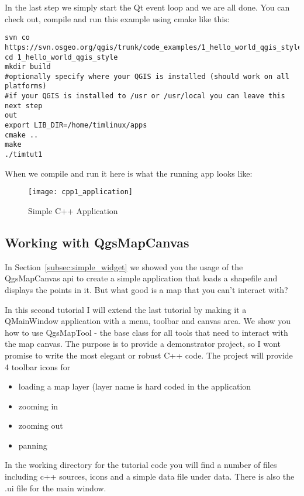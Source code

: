 In the last step we simply start the Qt event loop and we are all done. You
can check out, compile and run this example using cmake like this:

\begin{verbatim}
svn co
https://svn.osgeo.org/qgis/trunk/code_examples/1_hello_world_qgis_style
cd 1_hello_world_qgis_style
mkdir build
#optionally specify where your QGIS is installed (should work on all
platforms)
#if your QGIS is installed to /usr or /usr/local you can leave this next step
out
export LIB_DIR=/home/timlinux/apps
cmake ..
make
./timtut1
\end{verbatim}

When we compile and run it here is what the running app looks like:

\begin{figure}[ht]
   \begin{center}
   \caption{Simple C++ Application \osxcaption}\label{fig:cpp1_application}\smallskip
   \texttt{[image: cpp1\_application]}
\end{center}
\end{figure}

\subsection{Working with QgsMapCanvas}

In Section~\ref{subsec:simple_widget} we showed you the usage of the
QgsMapCanvas api to create a simple application that loads a shapefile and
displays the points in it. But what good is a map that you can't interact
with? 

In this second tutorial I will extend the last tutorial by making it a
QMainWindow application with a menu, toolbar and canvas area. We show you how
to use QgsMapTool - the base class for all tools that need to interact with
the map canvas.
The purpose is to provide a demonstrator project, so I wont promise to write the most
elegant or robust C++ code. The project will provide 4 toolbar icons for

\begin{itemize}
 \item loading a map layer (layer name is hard coded in the application
 \item zooming in
 \item zooming out
 \item panning
\end{itemize}

In the working directory for the tutorial code you will find a number of files
including c++ sources, icons and a simple data file under data. There is also
the .ui file for the main window.

